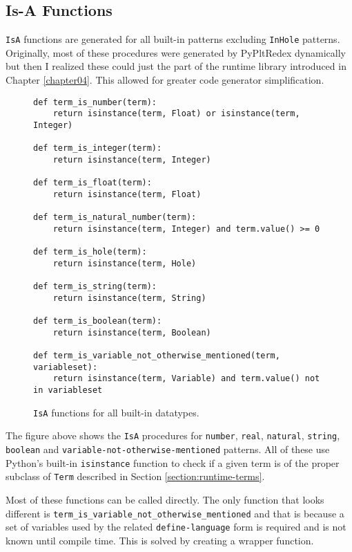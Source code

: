 \subsection{Is-A Functions}

\texttt{IsA} functions are generated for all built-in patterns excluding \texttt{InHole} patterns.  Originally, most of these procedures were generated by PyPltRedex dynamically but then I realized these could just the part of the runtime library introduced in Chapter \ref{chapter04}. This allowed for greater code generator simplification.

\begin{figure}[H]
\begin{verbatim}
def term_is_number(term):
    return isinstance(term, Float) or isinstance(term, Integer)

def term_is_integer(term):
    return isinstance(term, Integer)

def term_is_float(term):
    return isinstance(term, Float)

def term_is_natural_number(term):
    return isinstance(term, Integer) and term.value() >= 0

def term_is_hole(term):
    return isinstance(term, Hole)

def term_is_string(term):
    return isinstance(term, String)

def term_is_boolean(term):
    return isinstance(term, Boolean)

def term_is_variable_not_otherwise_mentioned(term, variableset):
    return isinstance(term, Variable) and term.value() not in variableset
\end{verbatim}
\caption{\texttt{IsA} functions for all built-in datatypes.}
\label{codegen-builtin-isa}
\end{figure}

The figure above shows the \texttt{IsA} procedures for \texttt{number}, \texttt{real}, \texttt{natural}, \texttt{string}, \texttt{boolean} and \texttt{variable-not-otherwise-mentioned} patterns. All of these use Python's built-in \texttt{isinstance} function to check if a given term is of the proper subclass of \texttt{Term} described in Section \ref{section:runtime-terms}.

Most of these functions can be called directly. The only function that looks different is \texttt{term\_is\_variable\_not\_otherwise\_mentioned} and that is because a set of variables used by the related \texttt{define-language} form is required and is not known until compile time. This is solved by creating a wrapper function.

